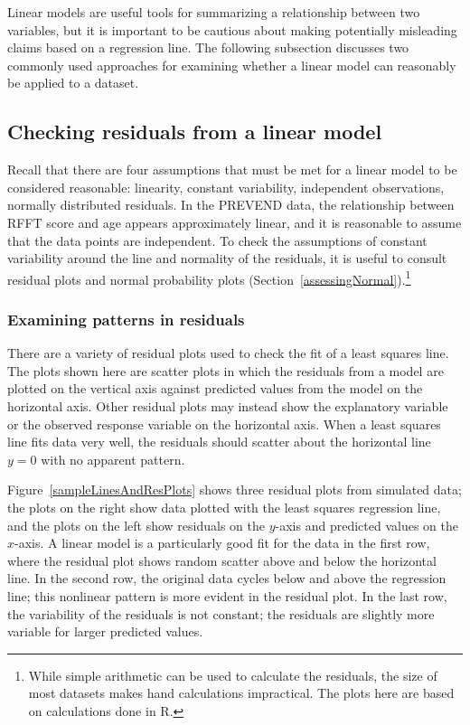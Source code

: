 Linear models are useful tools for summarizing a relationship between two variables, but it is important to be cautious about making potentially misleading claims based on a regression line. The following subsection discusses two commonly used approaches for examining whether a linear model can reasonably be applied to a dataset. 


\subsection{Checking residuals from a linear model}
\label{checkingResiduals}


Recall that there are four assumptions that must be met for a linear model to be considered reasonable: linearity, constant variability, independent observations, normally distributed residuals. In the PREVEND data, the relationship between RFFT score and age appears approximately linear, and it is reasonable to assume that the data points are independent. To check the assumptions of constant variability around the line and normality of the residuals, it is useful to consult residual plots and normal probability plots (Section~\ref{assessingNormal}).\footnote{While simple arithmetic can be used to calculate the residuals, the size of most datasets makes hand calculations impractical. The plots here are based on calculations done in \textsf{R}.}

\subsubsection{Examining patterns in residuals}


There are a variety of residual plots used to check the fit of a least squares line. The plots shown here are scatter plots in which the residuals from a model are plotted on the vertical axis against predicted values from the model on the horizontal axis. Other residual plots may instead show the explanatory variable or the observed response variable on the horizontal axis.  When a least squares line fits data very well, the residuals should scatter about the horizontal line $y = 0$ with no apparent pattern.

Figure~\ref{sampleLinesAndResPlots} shows three residual plots from simulated data; the plots on the right show data plotted with the least squares regression line, and the plots on the left show residuals on the $y$-axis and predicted values on the $x$-axis. A linear model is a particularly good fit for the data in the first row, where the residual plot shows random scatter above and below the horizontal line. In the second row, the original data cycles below and above the regression line; this nonlinear pattern is more evident in the residual plot. In the last row, the variability of the residuals is not constant; the residuals are slightly more variable for larger predicted values.


